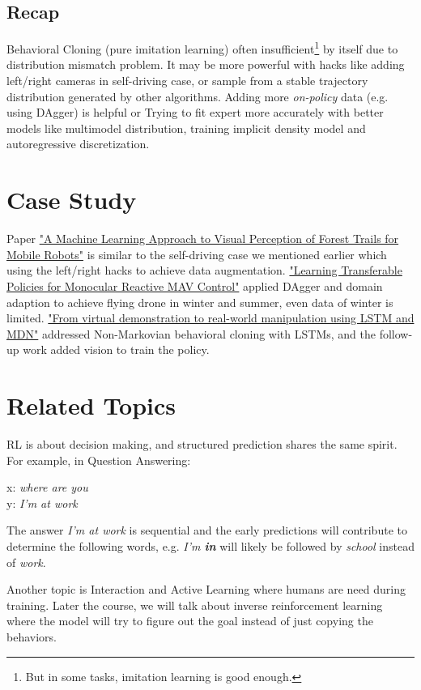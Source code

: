 \documentclass[nobib]{tufte-handout}
\begin{document}
\subsection{Recap}
Behavioral Cloning (pure imitation learning) often insufficient\thanks{But in some tasks, imitation learning is good enough.} by itself due to distribution mismatch problem. It may be more powerful with hacks like adding left/right cameras in self-driving case, or sample from a stable trajectory distribution generated by other algorithms. Adding more \emph{on-policy} data (e.g. using DAgger) is helpful or Trying to fit expert more accurately with better models like multimodel distribution, training implicit density model and autoregressive discretization.

\section{Case Study}
Paper \href{http://rpg.ifi.uzh.ch/docs/RAL16_Giusti.pdf}{"A Machine Learning Approach to Visual Perception of Forest Trails for Mobile Robots"} is similar to the self-driving case we mentioned earlier which using the left/right hacks to achieve data augmentation. \href{https://link.springer.com/chapter/10.1007/978-3-319-50115-4_1}{"Learning Transferable Policies for Monocular Reactive MAV Control"} applied DAgger and domain adaption to achieve flying drone in winter and summer, even data of winter is limited. \href{https://arxiv.org/abs/1603.03833}{"From virtual demonstration to real-world manipulation using LSTM and MDN"} addressed Non-Markovian behavioral cloning with LSTMs, and the follow-up work added vision to train the policy.

\section{Related Topics}
RL is about decision making, and structured prediction shares the same spirit. For example, in Question Answering:

\begin{center}
x: \textit{where are you} \\
y: \textit{I'm at work}
\end{center}

The answer \textit{I'm at work} is sequential and the early predictions will contribute to determine the following words, e.g. \textit{I'm \textbf{in}} will likely be followed by \textit{school} instead of \textit{work}.

Another topic is Interaction and Active Learning where humans are need during training. Later the course, we will talk about inverse reinforcement learning where the model will try to figure out the goal instead of just copying the behaviors.
\end{document}

